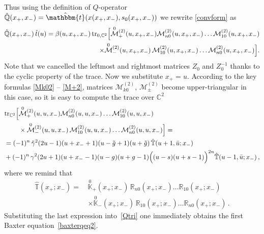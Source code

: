 \documentclass[a4paper,11pt]{article}
\newcommand{\tr}{\mathop{\rm tr}\nolimits}
\numberwithin{equation}{section}
\begin{document}
Thus using the definition of $Q$-operator $\hat{\mathbb{Q}}(x_+,x_-) = \hat{\mathbbm{t}}(x(x_+,x_-), s_0(x_+,x_-))$ we rewrite \eqref{convform} as
\begin{align}
	\nonumber
	\hat{\mathbb{Q}}(x_+,x_-)\,\hat{t}(u) = \beta(u,x_+,x_-) 
	\tr_{0,\mathbb{C}^2}\Bigl[
	\overset{0}{\mathcal{M}}{}^{(2)}_+(u,x_+,x_-) \mathcal{M}^{(2)}_{n0}(u,x_+,x_-) \dots \mathcal{M}^{(2)}_{10}(u,x_+,x_-) \\
	\label{Qtri}
	\times \overset{0}{\mathcal{M}}{}^{(2)}_-(u,x_+,x_-)\, \mathcal{M}^{(2)}_{10}(u,x_+,x_-) \dots \mathcal{M}^{(2)}_{n0}(u,x_+,x_-) \Bigr].
\end{align}
Note that we cancelled the leftmost and rightmost matrices $Z_0$ and $Z_0^{-1}$ thanks to the cyclic property of the trace.
Now we substitute $x_+=u$.
According to the key formulas \eqref{Mk02} -- \eqref{M+2}, matrices $\mathcal{M}^{(2)}_{k0}$, $\mathcal{M}^{(2)}_{\pm}$ become upper-triangular in this case, so it is easy to compute the trace over $\mathbb{C}^2$
\begin{align}
	& \nonumber
	\begin{aligned}
		\tr_{\mathbb{C}^2}\Bigl[ & \overset{0}{\mathcal{M}}{}^{(2)}_+(u,u,x_-) \mathcal{M}^{(2)}_{n0}(u,u,x_-) \dots \mathcal{M}^{(2)}_{10}(u,u,x_-) \\
		& \times
		\overset{0}{\mathcal{M}}{}^{(2)}_-(u,u,x_-)\, \mathcal{M}^{(2)}_{10}(u,u,x_-) \dots \mathcal{M}^{(2)}_{n0}(u,u,x_-) \Bigr] =
	\end{aligned} \\
	& \nonumber
	= (-1)^{n}\,\tilde{\gamma}^2(2u-1)(u+x_-+1)(u-\tilde{g}+1)(u+\tilde{g}) \, \hat{\mathbb{T}}(u+1,\bar{u};x_-) \\
	& \nonumber
	+ (-1)^{n}\,\gamma^2(2u+1)(u+x_--1)(u-g)(u+g-1)\Bigl((u-s)(u+s-1)\Bigr)^{2n}\hat{\mathbb{T}}(u-1,\bar{u};x_-) \,,
\end{align}
where we remind that
\begin{align*}
	\hat{\mathbb{T}}(x_+;x_-) = \, &
	\overset{0}{\mathbb{K}}_+(x_+;x_-)\,\mathbb{R}_{n0}(x_+;x_-)\dots\mathbb{R}_{10}(x_+;x_-) \\
	& \times 
	\overset{0}{\mathbb{K}}_-(x_+;x_-)\,\mathbb{R}_{10}(x_+;x_-)\dots\mathbb{R}_{n0}(x_+;x_-) \,.
\end{align*}
Substituting the last expression into~\eqref{Qtri} one immediately obtains the first Baxter equation~\eqref{baxterqeq2}.
\end{document}
